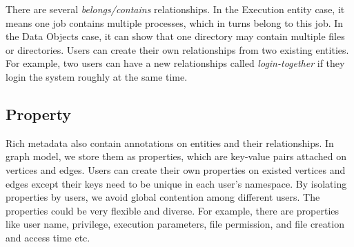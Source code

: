 There are several \textit{belongs/contains} relationships. In the Execution entity case, it means one job contains multiple processes, which in turns belong to this job. In the Data Objects case, it can show that one directory may contain multiple files or directories. Users can create their own relationships from two existing entities. For example, two users can have a new relationships called \textit{login-together} if they login the system roughly at the same time.

\subsection{Property}
Rich metadata also contain annotations on entities and their relationships. In graph model, we store them as properties, which are key-value pairs attached on vertices and edges. Users can create their own properties on existed vertices and edges except their keys need to be unique in each user's namespace. By isolating properties by users, we avoid global contention among different users.  The properties could be very flexible and diverse. For example, there are properties like user name, privilege, execution parameters, file permission, and file creation and access time etc. 

